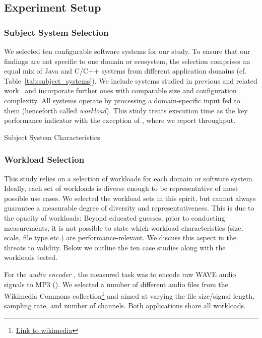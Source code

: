 \subsection{Experiment Setup}\label{sec:setup}
\subsubsection{Subject System Selection}
We selected ten configurable software systems for our study. To ensure that our findings are not specific to one domain or ecosystem, the selection comprises an equal mix of Java and C/C++ systems from different application domains (cf. Table~\ref{tab:subject_systems}). We include systems studied in previous and related work~\cite{velez_2020_configcrusher_jase,weber_white_2021,alves_sampling_2020} and incorporate further ones with comparable size and configuration complexity. All systems operate by processing a domain-specific input fed to them (henceforth called \textit{workload}). This study treats execution time as the key performance indicator with the exception of \htwo, where we report throughput.

\begin{table}
	\footnotesize
	\centering
	\caption{Subject System Characteristics}
	
	\label{tab:subject_systems}
\end{table}

\subsubsection{Workload Selection}
This study relies on a selection of workloads for each domain or software system. Ideally, each set of workloads is diverse enough to be representative of most possible use cases. We selected the workload sets in this spirit, but cannot always guarantee a measurable degree of diversity and representativeness. This is due to the opacity of workloads: Beyond educated guesses, prior to conducting measurements, it is not possible to state which workload characteristics (size, scale, file type etc.) are performance-relevant. We discuss this aspect in the threats to validity. Below we outline the ten case studies along with the workloads tested. 


For the \textit{audio encoder} \jumper, the measured task was to encode raw WAVE audio signals to MP3 (\jumper). We selected a number of different audio files from the Wikimedia Commons collection\footnote{\url{Link to wikimedia}} and aimed at varying the file size/signal length, sampling rate, and number of channels. Both applications share all workloads.

